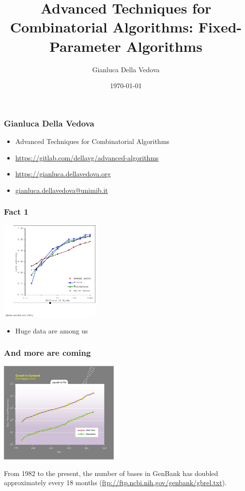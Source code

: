 \documentclass[12pt,aspectratio=169]{beamer}
\author{Gianluca Della Vedova}
\title[Advanced Algorithms]{Advanced Techniques for Combinatorial Algorithms:
Fixed-Parameter Algorithms}
\institute[]{Univ. Milano--Bicocca\\
  \texttt{https://gianluca.dellavedova.org}}
\date[]{{\tiny \today\hspace{1em} \vcsShortHash}}
\begin{document}
\begin{frame}
  \titlepage
\end{frame}


\begin{frame}\frametitle{Gianluca Della Vedova}
  \begin{itemize}
  \item
                Advanced Techniques for Combinatorial Algorithms
\item
{\small\url{https://gitlab.com/dellavg/advanced-algorithms}}
  \item
{\small\url{https://gianluca.dellavedova.org}}
  \item
{\small\url{gianluca.dellavedova@unimib.it}}
  \end{itemize}
\end{frame}

\begin{frame}\frametitle{Fact 1}
  \includegraphics[width=5cm]{img/growing-data-1}
  \begin{itemize}
  \item
    Huge data are among us
  \end{itemize}
\end{frame}


\begin{frame}\frametitle{And more are coming}
  \includegraphics[width=6cm]{img/Kurzweil_DNA_Sequence_data_growth,_base_pairs_and_sequences_per_year}

  \small
  From 1982 to the present, the number of bases in GenBank has doubled
approximately every 18 months (\url{ftp://ftp.ncbi.nih.gov/genbank/gbrel.txt}).
\end{frame}
\end{document}
